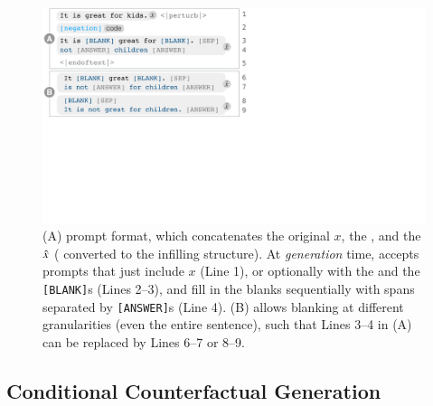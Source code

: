 \begin{figure}[t]
\centering
\includegraphics[trim={0 18.6cm 31.5cm 0cm}, clip, width=1\columnwidth]{figures/blank.pdf}
\vspace{-15pt}
\caption{ 
(A) \sysname prompt format, which concatenates the original $x$, the \tagstr, and the $\hat{x}$ ( converted to the infilling structure).
At \emph{generation} time, \sysname accepts prompts that just include $x$ (Line 1), or optionally with the \tagstrshort and the \texttt{[BLANK]}s (Lines 2--3), and fill in the blanks sequentially with spans separated by \texttt{[ANSWER]}s (Line 4).
(B) \sysname allows blanking at different granularities (even the entire sentence), such that Lines 3--4 in (A) can be replaced by Lines 6--7 or 8--9. 
}
\vspace{-10pt}
\label{fig:blank}
\end{figure}


\subsection{Conditional Counterfactual Generation}
\label{subsec:nlg}



